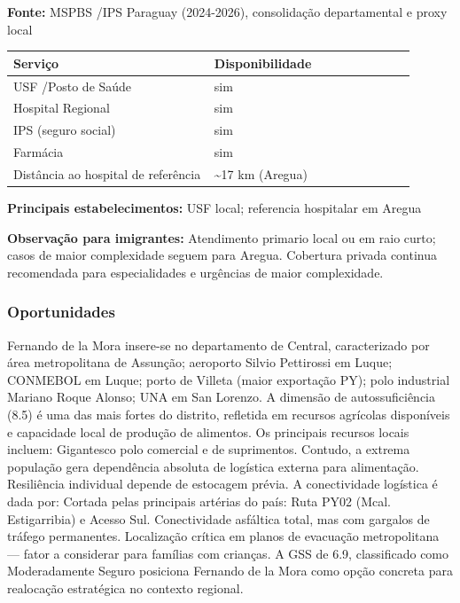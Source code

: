 \textbf{Fonte:} MSPBS /\allowbreak  IPS Paraguay (2024-2026), consolidação
departamental e proxy local

{\def\LTcaptype{none} %
\begin{longtable}{@{}>{\raggedright\arraybackslash}p{0.45\linewidth} >{\raggedright\arraybackslash}p{0.45\linewidth}@{}}
\toprule\noalign{}
Serviço & Disponibilidade \\
\midrule\noalign{}
\endhead
\bottomrule\noalign{}
\endlastfoot
USF /\allowbreak  Posto de Saúde & sim \\
Hospital Regional & sim \\
IPS (seguro social) & sim \\
Farmácia & sim \\
Distância ao hospital de referência & \textasciitilde17 km (Aregua) \\
\end{longtable}
}

\textbf{Principais estabelecimentos:} USF local; referencia hospitalar
em Aregua

\textbf{Observação para imigrantes:} Atendimento primario local ou em
raio curto; casos de maior complexidade seguem para Aregua. Cobertura
privada continua recomendada para especialidades e urgências de maior
complexidade.
\newpage

\subsubsection*{Oportunidades}\label{oport-fernando-de-la-mora-1103}
Fernando de la Mora insere-se no departamento de Central, caracterizado por área metropolitana de Assunção; aeroporto Silvio Pettirossi em Luque; CONMEBOL em Luque; porto de Villeta (maior exportação PY); polo industrial Mariano Roque Alonso; UNA em San Lorenzo. A dimensão de autossuficiência (8.5) é uma das mais fortes do distrito, refletida em recursos agrícolas disponíveis e capacidade local de produção de alimentos. Os principais recursos locais incluem: Gigantesco polo comercial e de suprimentos. Contudo, a extrema população gera dependência absoluta de logística externa para alimentação. Resiliência individual depende de estocagem prévia. A conectividade logística é dada por: Cortada pelas principais artérias do país: Ruta PY02 (Mcal. Estigarribia) e Acesso Sul. Conectividade asfáltica total, mas com gargalos de tráfego permanentes. Localização crítica em planos de evacuação metropolitana — fator a considerar para famílias com crianças. A GSS de 6.9, classificado como Moderadamente Seguro posiciona Fernando de la Mora como opção concreta para realocação estratégica no contexto regional.

